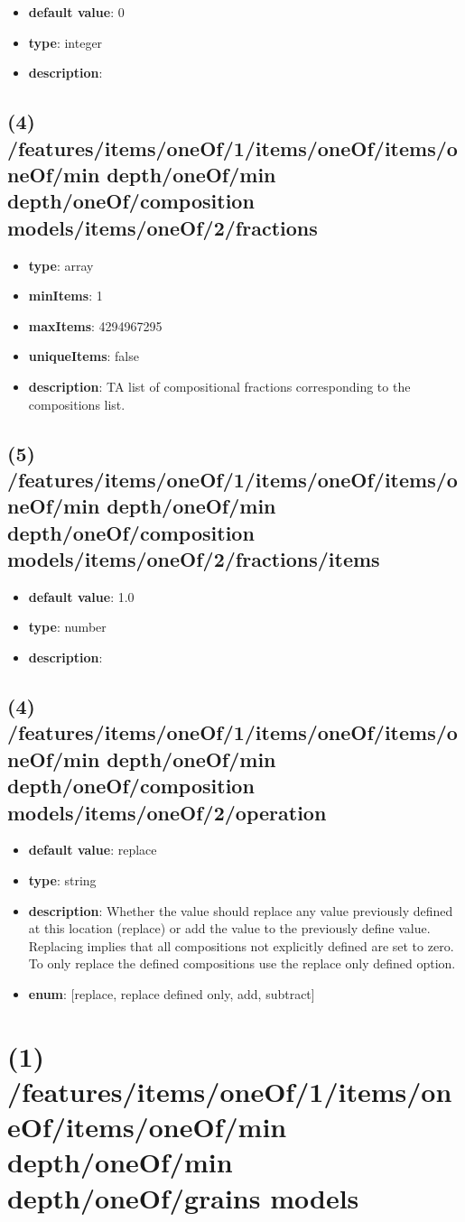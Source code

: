\begin{itemize}[leftmargin=5em]\item {\bf default value}: 0
\item {\bf type}: integer
\item {\bf description}: 
\end{itemize}\subsection{(4) /features/items/oneOf/1/items/oneOf/items/oneOf/min depth/oneOf/min depth/oneOf/composition models/items/oneOf/2/fractions}
\begin{itemize}[leftmargin=4em]\item {\bf type}: array
\item {\bf minItems}: 1
\item {\bf maxItems}: 4294967295
\item {\bf uniqueItems}: false
\item {\bf description}: TA list of compositional fractions corresponding to the compositions list.
\end{itemize}\subsection{(5) /features/items/oneOf/1/items/oneOf/items/oneOf/min depth/oneOf/min depth/oneOf/composition models/items/oneOf/2/fractions/items}
\begin{itemize}[leftmargin=5em]\item {\bf default value}: 1.0
\item {\bf type}: number
\item {\bf description}: 
\end{itemize}\subsection{(4) /features/items/oneOf/1/items/oneOf/items/oneOf/min depth/oneOf/min depth/oneOf/composition models/items/oneOf/2/operation}
\begin{itemize}[leftmargin=4em]\item {\bf default value}: replace
\item {\bf type}: string
\item {\bf description}: Whether the value should replace any value previously defined at this location (replace) or add the value to the previously define value. Replacing implies that all compositions not explicitly defined are set to zero. To only replace the defined compositions use the replace only defined option.
\item {\bf enum}: [replace, replace defined only, add, subtract]\end{itemize}\section{(1) /features/items/oneOf/1/items/oneOf/items/oneOf/min depth/oneOf/min depth/oneOf/grains models}
